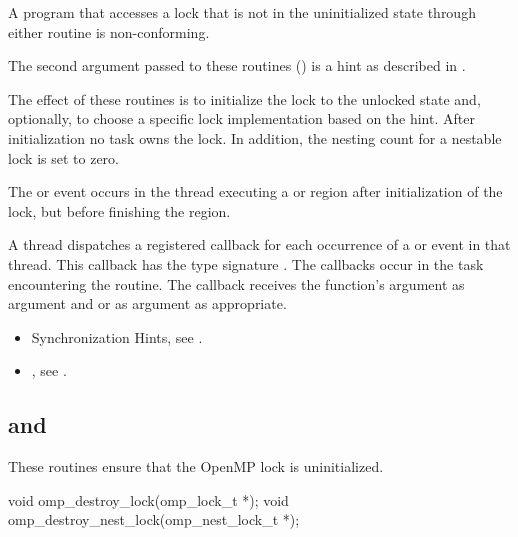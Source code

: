 \constraints
A program that accesses a lock that is not in the uninitialized state through either routine
is non-conforming.

The second argument passed to these routines () is a hint
as described in .

\effect
The effect of these routines is to initialize the lock to the unlocked state and, optionally, to choose a specific lock implementation based on the hint.
After initialization no task owns the lock. In addition, the nesting count for a nestable lock is set to zero.

\events

The  or  event occurs in the thread
executing a  or  region
after initialization of the lock, but before finishing the region.

\tools

A thread dispatches a registered 
callback for each occurrence of a  or  event
in that thread.  This callback has the type signature .
The callbacks occur in the task encountering the routine.
The callback receives the function's  argument as
 argument and
 or
  as  argument as appropriate.

\crossreferences
\begin{itemize}
\item Synchronization Hints, see .
\item {}, see
.
\end{itemize}



\subsection[\hcode{omp_destroy_lock} and \hcode{omp_destroy_nest_lock}]{ and\\ }
\label{subsec:omp_destroy_lock and omp_destroy_nest_lock}
\summary
These routines ensure that the OpenMP lock is uninitialized.

\format
\begin{ccppspecific}
\begin{ompcFunction}
void omp_destroy_lock(omp_lock_t *);
void omp_destroy_nest_lock(omp_nest_lock_t *);
\end{ompcFunction}
\end{ccppspecific}

